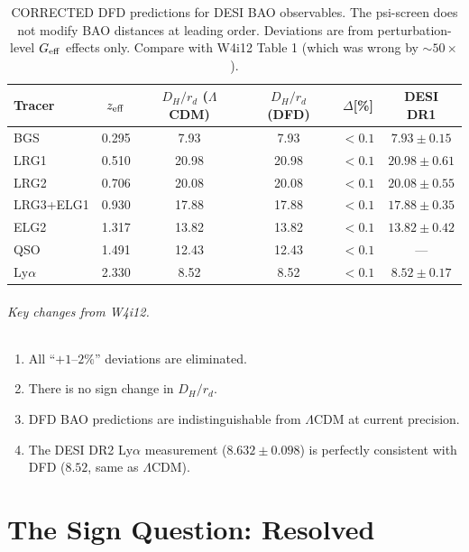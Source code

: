 \documentclass[11pt,a4paper]{article}
\newcommand{\LCDM}{$\Lambda$CDM}
\newcommand{\Geff}{G_{\rm eff}}
\begin{document}
\begin{table}[H]
\centering
\caption{CORRECTED DFD predictions for DESI BAO observables.
The psi-screen does not modify BAO distances at leading order.
Deviations are from perturbation-level $\Geff$ effects only.
Compare with W4i12 Table 1 (which was wrong by $\sim 50\times$).}
\label{tab:corrected}
\small
\begin{tabular}{lccccc}
\toprule
\textbf{Tracer} & $z_{\rm eff}$ &
$D_H/r_d$ (\LCDM) & $D_H/r_d$ (DFD) & $\Delta$[\%] &
DESI DR1 \\
\midrule
BGS & 0.295 & 7.93 & 7.93 & $< 0.1$ & $7.93 \pm 0.15$ \\
LRG1 & 0.510 & 20.98 & 20.98 & $< 0.1$ & $20.98 \pm 0.61$ \\
LRG2 & 0.706 & 20.08 & 20.08 & $< 0.1$ & $20.08 \pm 0.55$ \\
LRG3+ELG1 & 0.930 & 17.88 & 17.88 & $< 0.1$ & $17.88 \pm 0.35$ \\
ELG2 & 1.317 & 13.82 & 13.82 & $< 0.1$ & $13.82 \pm 0.42$ \\
QSO & 1.491 & 12.43 & 12.43 & $< 0.1$ & --- \\
Ly$\alpha$ & 2.330 & 8.52 & 8.52 & $< 0.1$ & $8.52 \pm 0.17$ \\
\bottomrule
\end{tabular}
\end{table}

\paragraph{Key changes from W4i12.}
\begin{enumerate}[nosep]
\item All ``$+1$--$2\%$'' deviations are eliminated.
\item There is no sign change in $D_H/r_d$.
\item DFD BAO predictions are indistinguishable from \LCDM{} at
  current precision.
\item The DESI DR2 Ly$\alpha$ measurement ($8.632 \pm 0.098$) is
  perfectly consistent with DFD ($8.52$, same as \LCDM).
\end{enumerate}


\part{The Sign Question: Resolved}
\label{part:sign}
\end{document}
